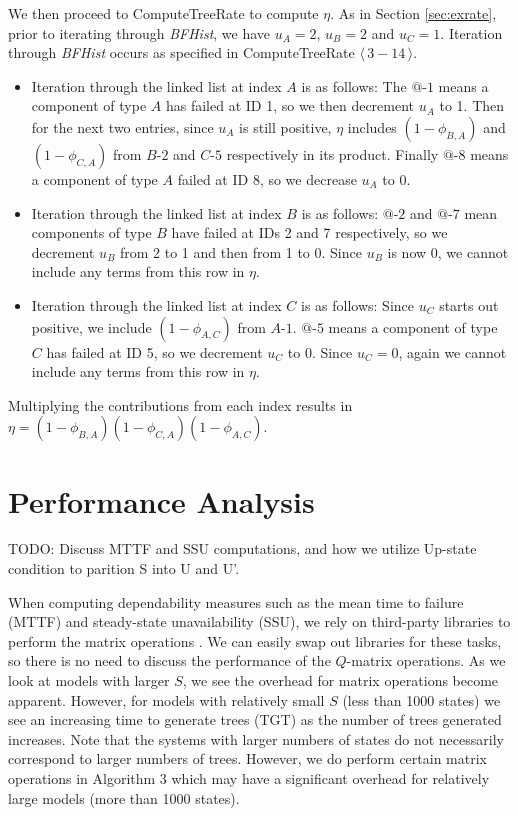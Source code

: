 \documentclass[12pt]{article}
\newcommand{\varName}[1]{\textrm{\it#1}}
\newcommand{\citeBlock}[2]{$\langle \, #1 - #2 \, \rangle$}
\newcommand{\nodeLabel}[2]{\mbox{$#1$-$#2$}}
\begin{document}
We then proceed to ComputeTreeRate to compute $\eta$. As in Section
\ref{sec:exrate}, prior to iterating through \varName{BFHist}, we have $u_A =
2$, $u_B = 2$ and $u_C = 1$. Iteration through \varName{BFHist} occurs as
specified in ComputeTreeRate \citeBlock{3}{14}.

\begin{itemize}
\item Iteration through the linked list at index $A$ is as follows: The
\nodeLabel{@}{1} means a component of type $A$ has failed at ID 1, so we then
decrement $u_{A}$ to 1. Then for the next two entries, since $u_{A}$ is still
positive, $\eta$ includes $(1 - \phi_{B, A})$ and $(1 - \phi_{C, A})$ from
\nodeLabel{B}{2} and \nodeLabel{C}{5} respectively in its product. Finally
\nodeLabel{@}{8} means a component of type $A$ failed at ID 8, so we decrease
$u_A$ to 0.

\item Iteration through the linked list at index $B$ is as follows:
\nodeLabel{@}{2} and \nodeLabel{@}{7} mean components of type $B$ have failed at
IDs 2 and 7 respectively, so we decrement $u_{B}$ from 2 to 1 and then from 1 to
0. Since $u_{B}$ is now 0, we cannot include any terms from this row in $\eta$.

\item Iteration through the linked list at index $C$ is as follows: Since
$u_{C}$ starts out positive, we include $(1 - \phi_{A, C})$ from
\nodeLabel{A}{1}. \nodeLabel{@}{5} means a component of type $C$ has failed at
ID 5, so we decrement $u_{C}$ to 0. Since $u_{C} = 0$, again we cannot include
any terms from this row in $\eta$.
\end{itemize}
Multiplying the contributions from each index results in $\eta = (1 - \phi_{B,
A}) (1 - \phi_{C, A}) (1 - \phi_{A, C})$.
 
\section{Performance Analysis}
TODO: Discuss MTTF and SSU computations, and how we utilize Up-state condition
to parition S into U and U'. 

When computing dependability measures such as the mean time to failure (MTTF)
and steady-state unavailability (SSU), we rely on third-party libraries to
perform the matrix operations \cite{OJAL:2013}. We can easily swap out
libraries for these tasks, so there is no need to discuss the performance of
the $Q$-matrix operations.  As we look at models with larger $S$, we see the
overhead for matrix operations become apparent.  However, for models with
relatively small $S$ (less than 1000 states) we see an increasing time to
generate trees (TGT) as the number of trees generated increases. Note that the
systems with larger numbers of states do not necessarily correspond to larger
numbers of trees.  However, we do perform certain matrix operations in
Algorithm 3 which may have a significant overhead for relatively large models
(more than 1000 states).
\\
\end{document}
